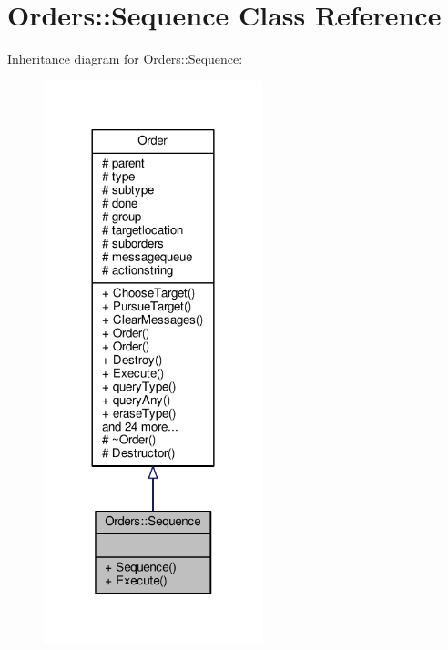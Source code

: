\hypertarget{classOrders_1_1Sequence}{}\section{Orders\+:\+:Sequence Class Reference}
\label{classOrders_1_1Sequence}


Inheritance diagram for Orders\+:\+:Sequence\+:
\nopagebreak
\begin{figure}[H]
\begin{center}
\leavevmode
\includegraphics[width=180pt]{df/d56/classOrders_1_1Sequence__inherit__graph}
\end{center}
\end{figure}


